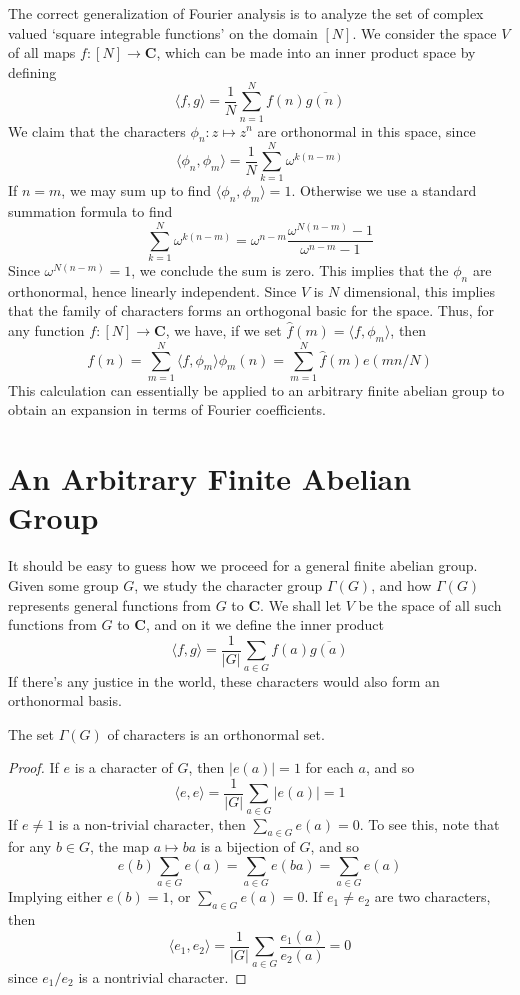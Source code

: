 The correct generalization of Fourier analysis is to analyze the set of complex valued `square integrable functions' on the domain $[N]$. We consider the space $V$ of all maps $f: [N] \to \mathbf{C}$, which can be made into an inner product space by defining
%
\[ \langle f, g \rangle = \frac{1}{N} \sum_{n = 1}^N f(n) \overline{g(n)} \]
%
We claim that the characters $\phi_n: z \mapsto z^n$ are orthonormal in this space, since
%
\[ \langle \phi_n, \phi_m \rangle = \frac{1}{N} \sum_{k = 1}^N \omega^{k(n-m)} \]
%
If $n = m$, we may sum up to find $\langle \phi_n, \phi_m \rangle = 1$. Otherwise we use a standard summation formula to find
%
\[ \sum_{k = 1}^N \omega^{k(n-m)} = \omega^{n-m} \frac{\omega^{N(n-m)} - 1}{\omega^{n-m} -1} \]
%
Since $\omega^{N(n-m)} = 1$, we conclude the sum is zero. This implies that the $\phi_n$ are orthonormal, hence linearly independent. Since $V$ is $N$ dimensional, this implies that the family of characters forms an orthogonal basic for the space. Thus, for any function $f: [N] \to \mathbf{C}$, we have, if we set $\widehat{f}(m) = \langle f, \phi_m \rangle$, then
%
\[ f(n) = \sum_{m = 1}^N \langle f, \phi_m \rangle \phi_m(n) = \sum_{m = 1}^N \widehat{f}(m) e(mn/N) \]
%
This calculation can essentially be applied to an arbitrary finite abelian group to obtain an expansion in terms of Fourier coefficients.

\section{An Arbitrary Finite Abelian Group}

It should be easy to guess how we proceed for a general finite abelian group. Given some group $G$, we study the character group $\Gamma(G)$, and how $\Gamma(G)$ represents general functions from $G$ to $\mathbf{C}$. We shall let $V$ be the space of all such functions from $G$ to $\mathbf{C}$, and on it we define the inner product
%
\[ \langle f, g \rangle = \frac{1}{|G|} \sum_{a \in G} f(a) \overline{g(a)} \]
%
If there's any justice in the world, these characters would also form an orthonormal basis.

\begin{theorem}
    The set $\Gamma(G)$ of characters is an orthonormal set.
\end{theorem}
\begin{proof}
    If $e$ is a character of $G$, then $|e(a)| = 1$ for each $a$, and so
    \[ \langle e, e \rangle = \frac{1}{|G|} \sum_{a \in G} |e(a)| = 1 \]
    If $e \neq 1$ is a non-trivial character, then $\sum_{a \in G} e(a) = 0$. To see this, note that for any $b \in G$, the map $a \mapsto ba$ is a bijection of $G$, and so
    \[ e(b) \sum_{a \in G} e(a) = \sum_{a \in G} e(ba) = \sum_{a \in G} e(a) \]
    Implying either $e(b) = 1$, or $\sum_{a \in G} e(a) = 0$. If $e_1 \neq e_2$ are two characters, then
    \[ \langle e_1, e_2 \rangle = \frac{1}{|G|} \sum_{a \in G} \frac{e_1(a)}{e_2(a)} = 0 \]
    since $e_1/e_2$ is a nontrivial character.
\end{proof}

